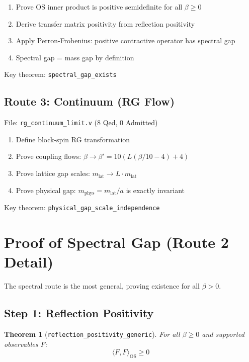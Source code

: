\documentclass[11pt, a4paper]{article}
\newtheorem{theorem}{Theorem}
\begin{document}
\begin{enumerate}
    \item Prove OS inner product is positive semidefinite for all $\beta \geq 0$
    \item Derive transfer matrix positivity from reflection positivity
    \item Apply Perron-Frobenius: positive contractive operator has spectral gap
    \item Spectral gap = mass gap by definition
\end{enumerate}

Key theorem: \texttt{spectral\_gap\_exists}

\subsection{Route 3: Continuum (RG Flow)}

File: \texttt{rg\_continuum\_limit.v} (8 Qed, 0 Admitted)

\begin{enumerate}
    \item Define block-spin RG transformation
    \item Prove coupling flows: $\beta \to \beta' = 10(L(\beta/10 - 4) + 4)$
    \item Prove lattice gap scales: $m_{\text{lat}} \to L \cdot m_{\text{lat}}$
    \item Prove physical gap: $m_{\text{phys}} = m_{\text{lat}}/a$ is exactly invariant
\end{enumerate}

Key theorem: \texttt{physical\_gap\_scale\_independence}

\section{Proof of Spectral Gap (Route 2 Detail)}

The spectral route is the most general, proving existence for all $\beta > 0$.

\subsection{Step 1: Reflection Positivity}

\begin{theorem}[\texttt{reflection\_positivity\_generic}]
For all $\beta \geq 0$ and supported observables $F$:
\begin{equation}
    \langle F, F \rangle_{\text{OS}} \geq 0
\end{equation}
\end{theorem}
\end{document}
